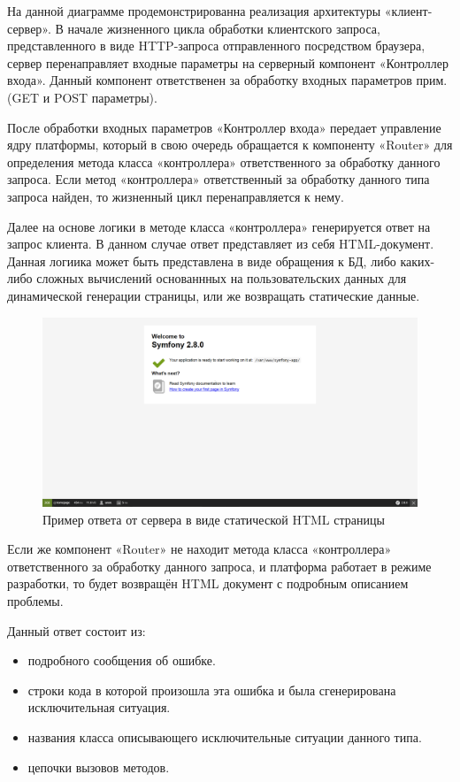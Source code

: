 На данной диаграмме продемонстрированна  реализация архитектуры «клиент-сервер». В начале жизненного цикла обработки клиентского запроса, представленного в виде HTTP-запроса отправленного посредством браузера, сервер перенаправляет входные параметры  на серверный компонент «Контроллер входа». Данный компонент ответственен за обработку входных параметров прим.(GET и POST параметры).

После обработки входных параметров «Контроллер входа» передает управление ядру платформы, который в свою очередь обращается к компоненту «Router» для определения метода класса «контроллера» ответственного за обработку данного запроса. Если метод «контроллера» ответственный за обработку данного типа запроса найден, то жизненный цикл перенаправляется к нему. 

Далее на основе логики в методе класса «контроллера» генерируется ответ на запрос клиента. В данном случае ответ представляет из себя HTML-документ. Данная логиика может быть представлена в виде обращения к БД, либо каких-либо сложных вычислений основаннных на пользовательских данных для динамической генерации страницы, или же возвращать статические данные.
 
\begin{figure}[ht]
\centering
  \includegraphics[scale=0.3]{images/welcome.png}  
  \caption{  Пример ответа от сервера в виде статической HTML страницы }
  \label{fig:domain:symfony_request_workflow}
\end{figure}

Если же компонент «Router» не находит метода класса «контроллера» ответственного за обработку данного запроса, и платформа работает в режиме разработки, то будет возвращён HTML документ с подробным описанием проблемы. 


Данный ответ состоит из:

\begin{itemize}
  \item подробного сообщения об ошибке.
  \item строки кода в которой произошла эта ошибка и была сгенерирована исключительная ситуация.
  \item названия класса описывающего исключительные ситуации данного типа.
  \item цепочки вызовов методов. 
\end{itemize}


